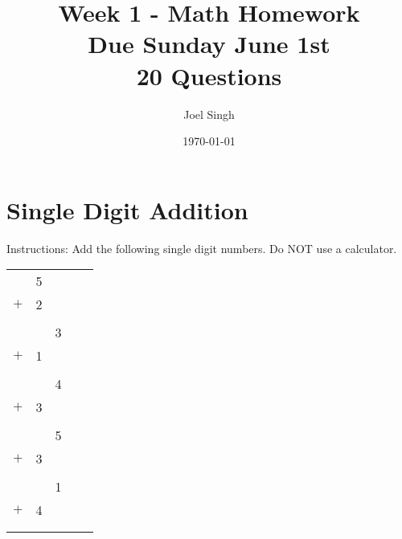 \documentclass{article}
\title{Week 1 - Math Homework \\ Due Sunday June 1st \\ 20 Questions}
\author{Joel Singh}
\date{\today}
\begin{document}
\maketitle

\section{Single Digit Addition}
Instructions: Add the following single digit numbers. Do NOT use a calculator.

\vspace{0.3in}
\begin{tabularx}{\textwidth}{XXXXX}
	\begin{tabular}{lS}
		&5 \\
		$+$&2 \\
		\hline 
		& \\
	\end{tabular}

	\vspace{0.1in}
	======

	&\begin{tabular}{lS}
		&3 \\
		$+$&1 \\
		\hline 
		& \\
	\end{tabular}

	\vspace{0.1in}
	======

	&\begin{tabular}{lS}
		&4 \\
		$+$&3 \\
		\hline 
		& \\
	\end{tabular}

	\vspace{0.1in}
	======

	&\begin{tabular}{lS}
		&5 \\
		$+$&3 \\
		\hline 
		& \\
	\end{tabular}

	\vspace{0.1in}
	======

	&\begin{tabular}{lS}
		&1 \\
		$+$&4 \\
		\hline 
		& \\
	\end{tabular} 


\end{tabularx}
\end{document}
